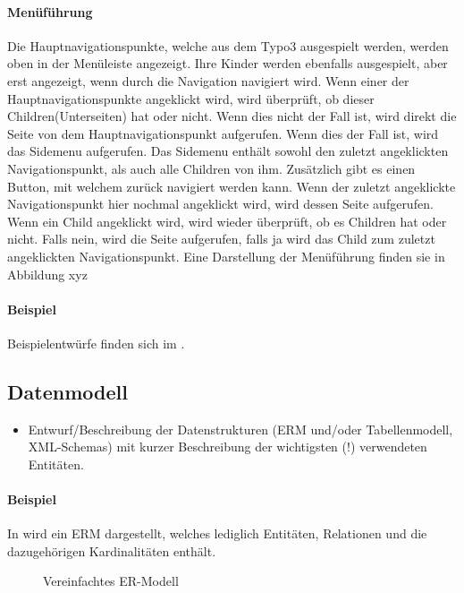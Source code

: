\paragraph{Menüführung}  
\linebreak
Die Hauptnavigationspunkte, welche aus dem Typo3 ausgespielt werden, werden oben in der Menüleiste angezeigt. Ihre Kinder werden ebenfalls ausgespielt, aber erst angezeigt, wenn durch die Navigation navigiert wird. Wenn einer der Hauptnavigationspunkte angeklickt wird, wird überprüft, ob dieser Children(Unterseiten) hat oder nicht. Wenn dies nicht der Fall ist, wird direkt die Seite von dem Hauptnavigationspunkt aufgerufen. Wenn dies der Fall ist, wird das Sidemenu aufgerufen. Das Sidemenu enthält sowohl den zuletzt angeklickten Navigationspunkt, als auch alle Children von ihm. Zusätzlich gibt es einen Button, mit welchem zurück navigiert werden kann. Wenn der zuletzt angeklickte Navigationspunkt hier nochmal angeklickt wird, wird dessen Seite aufgerufen. Wenn ein Child angeklickt wird, wird wieder überprüft, ob es Children hat oder nicht. Falls nein, wird die Seite aufgerufen, falls ja wird das Child zum zuletzt angeklickten Navigationspunkt. Eine Darstellung der Menüführung finden sie in Abbildung xyz

\paragraph{Beispiel}
Beispielentwürfe finden sich im .


\subsection{Datenmodell}
\label{sec:Datenmodell}

\begin{itemize}
	\item Entwurf/Beschreibung der Datenstrukturen (\zB \acs{ERM} und/oder Tabellenmodell, \acs{XML}-Schemas) mit kurzer Beschreibung der wichtigsten (!) verwendeten Entitäten.
\end{itemize}

\paragraph{Beispiel}
In  wird ein \ac{ERM} dargestellt, welches lediglich Entitäten, Relationen und die dazugehörigen Kardinalitäten enthält. 

\begin{figure}[htb]
\centering
{}
\caption{Vereinfachtes ER-Modell}
\label{fig:ER}
\end{figure} 


